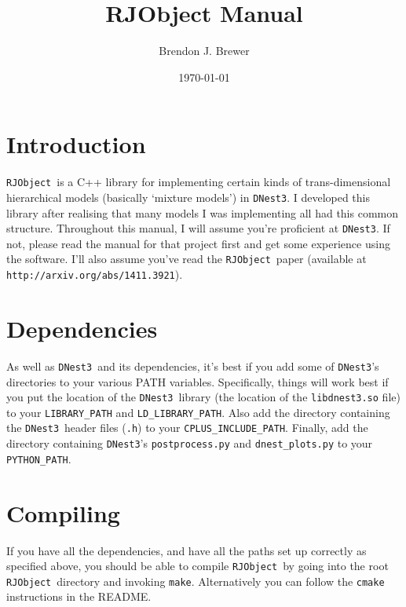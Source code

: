 \documentclass[a4paper, 11pt]{article}
\title{RJObject Manual}
\author{Brendon J. Brewer}
\date{\today}
\newcommand{\rjobject}{{\tt RJObject}}
\newcommand{\dnest}{{\tt DNest3}}
\begin{document}
\maketitle

\section{Introduction}
\rjobject~is a C++ library for implementing certain kinds of trans-dimensional
hierarchical models (basically `mixture models') in \dnest. I developed this
library after realising that many models I was implementing all had this
common structure.
Throughout this manual, I will assume you're proficient at
\dnest. If not, please read the manual for that project first and get some
experience using the software. I'll also assume you've read the \rjobject~paper
(available at {\tt http://arxiv.org/abs/1411.3921}).

\section{Dependencies}
As well as \dnest~and its dependencies, it's best if you add some of
\dnest's directories to your various PATH variables.
Specifically, things will work best
if you put the location of the \dnest~library (the location of
the {\tt libdnest3.so} file) to your {\tt LIBRARY\_PATH} and
{\tt LD\_LIBRARY\_PATH}. Also add the directory containing the \dnest~header
files ({\tt *.h}) to your {\tt CPLUS\_INCLUDE\_PATH}. Finally, add the
directory containing \dnest's {\tt postprocess.py} and {\tt dnest\_plots.py} to
your {\tt PYTHON\_PATH}.

\section{Compiling}
If you have all the dependencies, and have all the paths set up correctly as
specified above, you should be able to compile \rjobject~by going into the
root \rjobject~directory and invoking {\tt make}. Alternatively you can follow
the {\tt cmake} instructions in the README.
\end{document}
